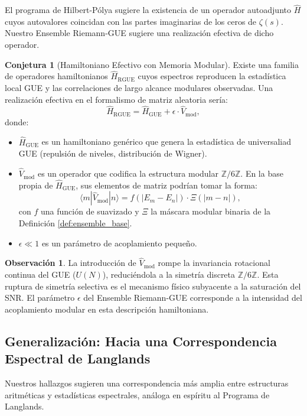 \documentclass[12pt, a4paper]{article}
\theoremstyle{plain}
\theoremstyle{definition}
\newtheorem{observacion}[teorema]{Observación}
\newtheorem{conjetura}[teorema]{Conjetura}
\theoremstyle{remark}
\begin{document}
El programa de Hilbert-Pólya sugiere la existencia de un operador autoadjunto $\hat{H}$ cuyos autovalores coincidan con las partes imaginarias de los ceros de $\zeta(s)$. Nuestro Ensemble Riemann-GUE sugiere una realización efectiva de dicho operador.

\begin{conjetura}[Hamiltoniano Efectivo con Memoria Modular]
Existe una familia de operadores hamiltonianos $\hat{H}_{\text{RGUE}}$ cuyos espectros reproducen la estadística local GUE y las correlaciones de largo alcance modulares observadas. Una realización efectiva en el formalismo de matriz aleatoria sería:
\[
\hat{H}_{\text{RGUE}} = \hat{H}_{\text{GUE}} + \epsilon \cdot \hat{V}_{\text{mod}},
\]
donde:
\begin{itemize}
    \item $\hat{H}_{\text{GUE}}$ es un hamiltoniano genérico que genera la estadística de universaliad GUE (repulsión de niveles, distribución de Wigner).
    \item $\hat{V}_{\text{mod}}$ es un operador que codifica la estructura modular $\mathbb{Z}/6\mathbb{Z}$. En la base propia de $\hat{H}_{\text{GUE}}$, sus elementos de matriz podrían tomar la forma:
    \[
    \langle m | \hat{V}_{\text{mod}} | n \rangle = f(|E_m - E_n|) \cdot \Xi(|m-n|),
    \]
    con $f$ una función de suavizado y $\Xi$ la máscara modular binaria de la Definición \ref{def:ensemble_base}.
    \item $\epsilon \ll 1$ es un parámetro de acoplamiento pequeño.
\end{itemize}
\end{conjetura}

\begin{observacion}
La introducción de $\hat{V}_{\text{mod}}$ rompe la invariancia rotacional continua del GUE ($U(N)$), reduciéndola a la simetría discreta $\mathbb{Z}/6\mathbb{Z}$. Esta ruptura de simetría selectiva es el mecanismo físico subyacente a la saturación del SNR. El parámetro $\epsilon$ del Ensemble Riemann-GUE corresponde a la intensidad del acoplamiento modular en esta descripción hamiltoniana.
\end{observacion}

\subsection{Generalización: Hacia una Correspondencia Espectral de Langlands}
\label{ap:generalizacion_dirichlet}

Nuestros hallazgos sugieren una correspondencia más amplia entre estructuras aritméticas y estadísticas espectrales, análoga en espíritu al Programa de Langlands.
\end{document}
